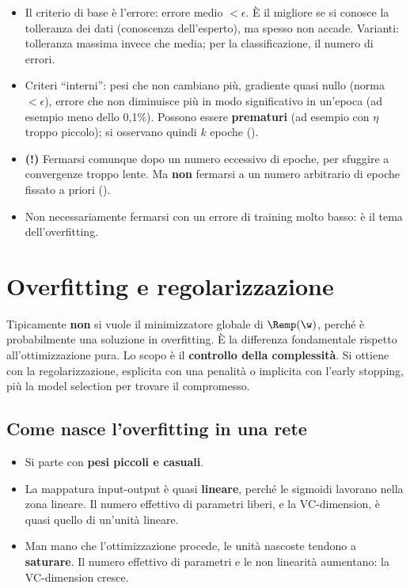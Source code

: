 \begin{itemize}
  \item Il criterio di base è l'errore: errore medio $<\epsilon$. È il migliore se si conosce la tolleranza dei
        dati (conoscenza dell'esperto), ma spesso non accade. Varianti: tolleranza massima invece che media; per
        la classificazione, il numero di errori.
  \item Criteri ``interni'': pesi che non cambiano più, gradiente quasi nullo (norma $<\epsilon$), errore che non
        diminuisce più in modo significativo in un'epoca (ad esempio meno dello 0,1\%). Possono essere
        \textbf{prematuri} (ad esempio con $\eta$ troppo piccolo); si osservano quindi $k$ epoche
        ().
  \item \textbf{(!)} Fermarsi comunque dopo un numero eccessivo di epoche, per sfuggire a convergenze troppo
        lente. Ma \textbf{non} fermarsi a un numero arbitrario di epoche fissato a priori
        ().
  \item Non necessariamente fermarsi con un errore di training molto basso: è il tema dell'overfitting.
\end{itemize}

\section{Overfitting e regolarizzazione}
\label{sec:reg-reti}

Tipicamente \textbf{non} si vuole il minimizzatore globale di $\Remp(\w)$, perché è probabilmente una soluzione in
overfitting. È la differenza fondamentale rispetto all'ottimizzazione pura. Lo scopo è il \textbf{controllo della
complessità}. Si ottiene con la regolarizzazione, esplicita con una penalità o implicita con l'early stopping, più
la model selection per trovare il compromesso.

\subsection{Come nasce l'overfitting in una rete}
\begin{itemize}
  \item Si parte con \textbf{pesi piccoli e casuali}.
  \item La mappatura input-output è quasi \textbf{lineare}, perché le sigmoidi lavorano nella zona lineare. Il
        numero effettivo di parametri liberi, e la VC-dimension, è quasi quello di un'unità lineare.
  \item Man mano che l'ottimizzazione procede, le unità nascoste tendono a \textbf{saturare}. Il numero effettivo
        di parametri e le non linearità aumentano: la VC-dimension cresce.
\end{itemize}

